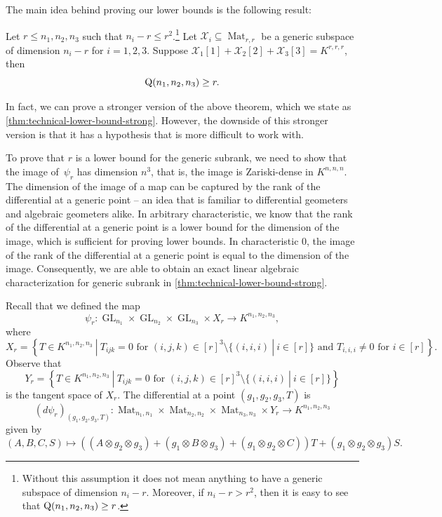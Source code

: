 \documentclass[11pt]{article}
\theoremstyle{definition}
\theoremstyle{remark}
\newcommand{\gensubrank}{{\rm Q}}
\newcommand{\GL}{\operatorname{GL}}
\newcommand{\Mat}{\operatorname{Mat}}
\begin{document}
The main idea behind proving our lower bounds is the following result:

\begin{theorem} \label{thm:technical-lower-bound}
Let $r \leq n_1,n_2,n_3$ such that $n_i - r \leq r^2$.\footnote{Without this assumption it does not mean anything to have a generic subspace of dimension $n_i - r$. Moreover, if $n_i - r  > r^2$, then it is easy to see that $\gensubrank(n_1,n_2,n_3) \geq r$.} Let $\mathcal{X}_i \subseteq \Mat_{r,r}$ be a generic subspace of dimension $n_i - r$ for $i = 1,2,3$. Suppose $\mathcal{X}_1[1] + \mathcal{X}_2[2] + \mathcal{X}_3[3] = K^{r,r,r}$, then
$$
\gensubrank(n_1,n_2,n_3) \geq r.
$$
\end{theorem}

%

In fact, we can prove a stronger version of the above theorem, which we state as \autoref{thm:technical-lower-bound-strong}. However, the downside of this stronger version is that it has a hypothesis that is more difficult to work with. 

To prove that $r$ is a lower bound for the generic subrank, we need to show that the image of~$\psi_r$ has dimension $n^3$, that is, the image is Zariski-dense in $K^{n,n,n}$. The dimension of the image of a map can be captured by the rank of the differential at a generic point -- an idea that is familiar to differential geometers and algebraic geometers alike. In arbitrary characteristic, we know that the rank of the differential at a generic point is a lower bound for the dimension of the image, which is sufficient for proving lower bounds. In characteristic $0$, the image of the rank of the differential at a generic point is equal to the dimension of the image. Consequently, we are able to obtain an exact linear algebraic characterization for generic subrank in \autoref{thm:technical-lower-bound-strong}.

Recall that we defined the map 
$$
\psi_r : \GL_{n_1} \times \GL_{n_2} \times \GL_{n_3} \times X_r \rightarrow K^{n_1,n_2,n_3},
$$
where 
$$
X_r = \left\{T \in K^{n_1,n_2,n_3} \ | \ T_{ijk} = 0 \text{ for } (i,j,k) \in [r]^3 \setminus \{(i,i,i)\ |\ i \in [r]\} \text{ and } T_{i,i,i} \neq 0 \text{ for } i \in [r] \right\}.
$$
Observe that 
\[
Y_r = \left\{T \in K^{n_1,n_2,n_3} \ | \ T_{ijk} = 0 \text{ for } (i,j,k) \in [r]^3 \setminus \{(i,i,i)\ |\ i \in [r] \} \right\}
\]is the tangent space of $X_r$. The differential at a point $(g_1,g_2,g_3,T)$ is
$$
 (d\psi_r)_{(g_1,g_2,g_3,T)} : \Mat_{n_1,n_1} \times \Mat_{n_2,n_2} \times \Mat_{n_3,n_3} \times Y_r  \longrightarrow  K^{n_1,n_2,n_3} 
$$
given by 
$$
(A,B,C,S)  \longmapsto  ((A \otimes g_2 \otimes g_3) + (g_1 \otimes B \otimes g_3) + (g_1 \otimes g_2 \otimes C))T + (g_1 \otimes g_2 \otimes g_3)S.
$$
\end{document}
